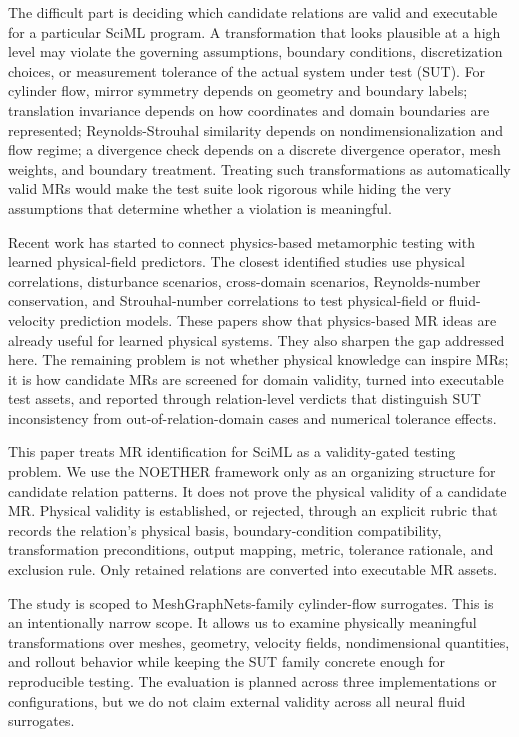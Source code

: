 The difficult part is deciding which candidate relations are valid and
executable for a particular SciML program. A transformation that looks
plausible at a high level may violate the governing assumptions,
boundary conditions, discretization choices, or measurement tolerance of
the actual system under test (SUT). For cylinder flow, mirror symmetry
depends on geometry and boundary labels; translation invariance depends
on how coordinates and domain boundaries are represented;
Reynolds-Strouhal similarity depends on nondimensionalization and flow
regime; a divergence check depends on a discrete divergence operator,
mesh weights, and boundary treatment. Treating such transformations as
automatically valid MRs would make the test suite look rigorous while
hiding the very assumptions that determine whether a violation is
meaningful.

Recent work has started to connect physics-based metamorphic testing
with learned physical-field predictors. The closest identified studies
use physical correlations, disturbance scenarios, cross-domain
scenarios, Reynolds-number conservation, and Strouhal-number
correlations to test physical-field or fluid-velocity prediction models.
These papers show that physics-based MR ideas are already useful for
learned physical systems. They also sharpen the gap addressed here. The
remaining problem is not whether physical knowledge can inspire MRs; it
is how candidate MRs are screened for domain validity, turned into
executable test assets, and reported through relation-level verdicts
that distinguish SUT inconsistency from out-of-relation-domain cases and
numerical tolerance effects.

This paper treats MR identification for SciML as a validity-gated
testing problem. We use the NOETHER framework only as an organizing
structure for candidate relation patterns. It does not prove the
physical validity of a candidate MR. Physical validity is established,
or rejected, through an explicit rubric that records the relation's
physical basis, boundary-condition compatibility, transformation
preconditions, output mapping, metric, tolerance rationale, and
exclusion rule. Only retained relations are converted into executable MR
assets.

The study is scoped to MeshGraphNets-family cylinder-flow surrogates.
This is an intentionally narrow scope. It allows us to examine
physically meaningful transformations over meshes, geometry, velocity
fields, nondimensional quantities, and rollout behavior while keeping
the SUT family concrete enough for reproducible testing. The evaluation
is planned across three implementations or configurations, but we do not
claim external validity across all neural fluid surrogates.

